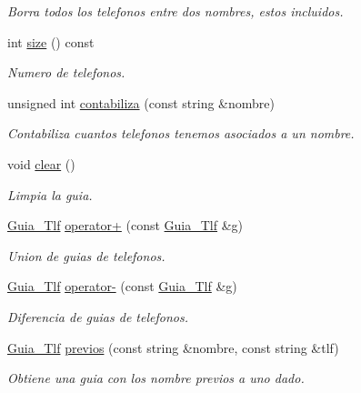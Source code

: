 \begin{DoxyCompactItemize}
\begin{DoxyCompactList}\small\item\em Borra todos los telefonos entre dos nombres, estos incluidos. \end{DoxyCompactList}\item 
int \mbox{\hyperlink{classGuia__Tlf_a727ab46d490b4196a71f623644906a81}{size}} () const
\begin{DoxyCompactList}\small\item\em Numero de telefonos. \end{DoxyCompactList}\item 
unsigned int \mbox{\hyperlink{classGuia__Tlf_aa63213524c6339ea89baae2b5d2ebb69}{contabiliza}} (const string \&nombre)
\begin{DoxyCompactList}\small\item\em Contabiliza cuantos telefonos tenemos asociados a un nombre. \end{DoxyCompactList}\item 
\mbox{\label{classGuia__Tlf_a36ac970ece51a62763bb3898159d0047}} 
void \mbox{\hyperlink{classGuia__Tlf_a36ac970ece51a62763bb3898159d0047}{clear}} ()
\begin{DoxyCompactList}\small\item\em Limpia la guia. \end{DoxyCompactList}\item 
\mbox{\hyperlink{classGuia__Tlf}{Guia\+\_\+\+Tlf}} \mbox{\hyperlink{classGuia__Tlf_a3e0b08a1985d3c72853690730319172f}{operator+}} (const \mbox{\hyperlink{classGuia__Tlf}{Guia\+\_\+\+Tlf}} \&g)
\begin{DoxyCompactList}\small\item\em Union de guias de telefonos. \end{DoxyCompactList}\item 
\mbox{\hyperlink{classGuia__Tlf}{Guia\+\_\+\+Tlf}} \mbox{\hyperlink{classGuia__Tlf_ac381d53f275ce769830e07fbc56902b0}{operator-\/}} (const \mbox{\hyperlink{classGuia__Tlf}{Guia\+\_\+\+Tlf}} \&g)
\begin{DoxyCompactList}\small\item\em Diferencia de guias de telefonos. \end{DoxyCompactList}\item 
\mbox{\hyperlink{classGuia__Tlf}{Guia\+\_\+\+Tlf}} \mbox{\hyperlink{classGuia__Tlf_a0a8ed6b386e90a6799a8693653b3e187}{previos}} (const string \&nombre, const string \&tlf)
\begin{DoxyCompactList}\small\item\em Obtiene una guia con los nombre previos a uno dado. \end{DoxyCompactList}\item 

\end{DoxyCompactItemize}
